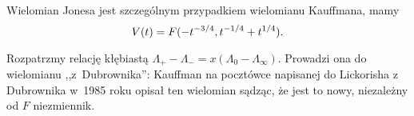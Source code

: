 \begin{proposition}
%
    Wielomian Jonesa jest szczególnym przypadkiem wielomianu Kauffmana, mamy
    \begin{equation}
        V(t)=F(-t^{-3/4},t^{-1/4}+t^{1/4}).
    \end{equation}
\end{proposition}

Rozpatrzmy relację kłębiastą $\Lambda_+ - \Lambda_- = x(\Lambda_0 - \Lambda_\infty)$.
Prowadzi ona do wielomianu ,,z~Dubrownika'': Kauffman na pocztówce napisanej do Lickorisha z Dubrownika w~1985 roku opisał ten wielomian sądząc, że jest to nowy, niezależny od $F$ niezmiennik.
%
%
%


